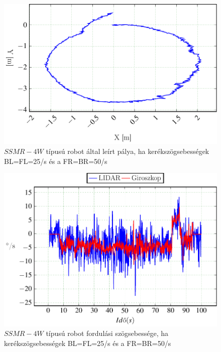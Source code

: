 \begin{figure}[H]
  \includegraphics{tikz/KorP0703b.pdf}
  \caption{$SSMR-4W$ típusú robot által leírt pálya, ha kerékszögsebességek BL=FL=25\degree/s és a FR=BR=50\degree/s}
  \label{fig:KorP0703b}
\end{figure}




\begin{figure}[H]
  \begin{center}
  	\includegraphics[scale=1]{tikz/KorP0703d.pdf}
  \end{center}
  \caption{$SSMR-4W$ típusú robot fordulási szögsebessége, ha kerékszögsebességek BL=FL=25\degree/s és a FR=BR=50\degree/s}
  \label{fig:KorP0703d}
\end{figure}



